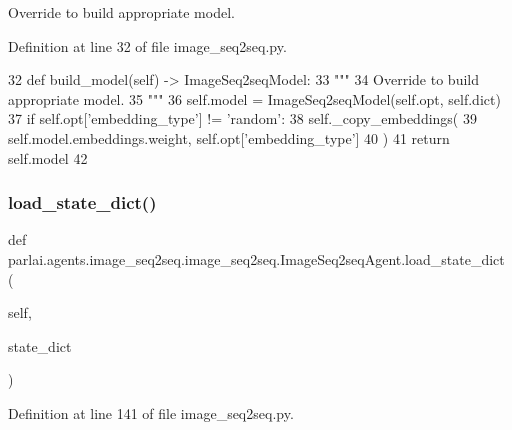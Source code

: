 \begin{DoxyVerb}Override to build appropriate model.
\end{DoxyVerb}
 

Definition at line 32 of file image\+\_\+seq2seq.\+py.


\begin{DoxyCode}
32     \textcolor{keyword}{def }build\_model(self) -> ImageSeq2seqModel:
33         \textcolor{stringliteral}{"""}
34 \textcolor{stringliteral}{        Override to build appropriate model.}
35 \textcolor{stringliteral}{        """}
36         self.model = ImageSeq2seqModel(self.opt, self.dict)
37         \textcolor{keywordflow}{if} self.opt[\textcolor{stringliteral}{'embedding\_type'}] != \textcolor{stringliteral}{'random'}:
38             self.\_copy\_embeddings(
39                 self.model.embeddings.weight, self.opt[\textcolor{stringliteral}{'embedding\_type'}]
40             )
41         \textcolor{keywordflow}{return} self.model
42 
\end{DoxyCode}
\mbox{\label{classparlai_1_1agents_1_1image__seq2seq_1_1image__seq2seq_1_1ImageSeq2seqAgent_ad39de2ed722157ff5756b28c37ab9205}} 
\subsubsection{\texorpdfstring{load\+\_\+state\+\_\+dict()}{load\_state\_dict()}}
{\footnotesize\ttfamily def parlai.\+agents.\+image\+\_\+seq2seq.\+image\+\_\+seq2seq.\+Image\+Seq2seq\+Agent.\+load\+\_\+state\+\_\+dict (\begin{DoxyParamCaption}\item[{}]{self,  }\item[{}]{state\+\_\+dict }\end{DoxyParamCaption})}



Definition at line 141 of file image\+\_\+seq2seq.\+py.


